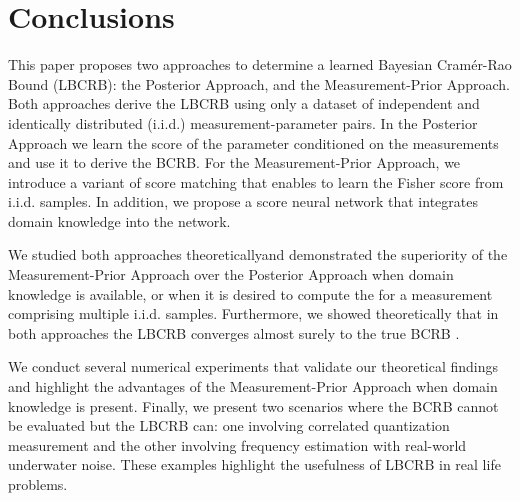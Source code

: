 \documentclass[journal,twoside,web]{ieeecolor}
\begin{document}







\section{Conclusions}\label{sec:conclusions}
This paper proposes two approaches to determine a learned Bayesian Cramér-Rao Bound (LBCRB): the Posterior Approach, and the Measurement-Prior Approach. Both approaches derive the LBCRB using only a dataset of independent and identically distributed (i.i.d.) measurement-parameter pairs. In the Posterior Approach we learn the score of the parameter conditioned on the measurements and use it to derive the BCRB. For the Measurement-Prior Approach, we introduce a variant of score matching that enables  to learn the Fisher score from i.i.d. samples. In addition, we propose a \pe{} score neural network that integrates domain knowledge into the network. 

We  {studied} both approaches theoreticallyand demonstrated the superiority of the Measurement-Prior Approach  over the Posterior Approach when domain knowledge is available, {or when it is desired to compute the \name{} for a measurement comprising multiple i.i.d. samples}. Furthermore, we showed theoretically that in both approaches the LBCRB converges almost surely to the true BCRB . 

We conduct several numerical experiments that validate our theoretical findings and highlight the advantages of the Measurement-Prior Approach when domain knowledge is present. Finally, we present two scenarios where the BCRB cannot be evaluated but the LBCRB can: one involving correlated quantization measurement and the other involving frequency estimation with real-world underwater noise. These examples highlight the usefulness of LBCRB in real life problems. 

\end{document}
